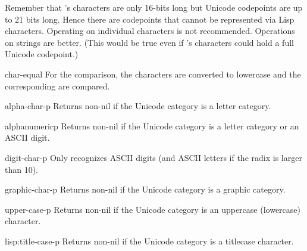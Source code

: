 Remember that \cmucl{}'s characters are only 16-bits long but Unicode
codepoints are up to 21 bits long.  Hence there are codepoints that
cannot be represented via Lisp characters.  Operating on individual
characters is not recommended.  Operations on strings are better.
(This would be true even if \cmucl{}'s characters could hold a
full Unicode codepoint.)

\begin{defun}{}{char-equal}{\amprest{} }
   For the comparison, the characters are converted to lowercase and
   the corresponding  are compared.
\end{defun}

\begin{defun}{}{alpha-char-p}{\args {}}
  Returns non-nil{} if the Unicode category is a letter category.
\end{defun}

\begin{defun}{}{alphanumericp}{\args {}}
  Returns non-nil{} if the Unicode category is a letter category or an ASCII
  digit.
\end{defun}

\begin{defun}{}{digit-char-p}{\args {} \ampoptional{} }
   Only recognizes ASCII digits (and ASCII letters if the radix is larger
   than 10).
\end{defun}

\begin{defun}{}{graphic-char-p}{\args {}}
  Returns non-nil{} if the Unicode category is a graphic category.
\end{defun}

\begin{defun}{}{upper-case-p}{\args {}}
  Returns non-nil{} if the Unicode category is an uppercase
  (lowercase) character.
\end{defun}

\begin{defun}{lisp:}{title-case-p}{\args {}}
  Returns non-nil{} if the Unicode category is a titlecase character.
\end{defun}

